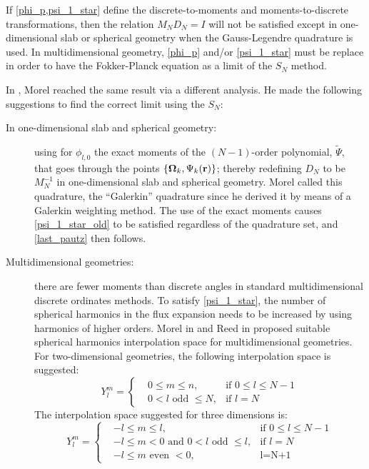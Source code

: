 If \cref{phi_p,psi_1_star} define the discrete-to-moments and
moments-to-discrete transformations, then the relation $M_N D_N=I$ will not be
satisfied except in one-dimensional slab or spherical geometry when the
Gauss-Legendre quadrature is used. In multidimensional geometry, \cref{phi_p}
and/or \cref{psi_1_star} must be replace in order to have the Fokker-Planck
equation as a limit of the $S_N$ method.

In \cite{galerkin_morel}, Morel reached the same result via a different
analysis. He made the following suggestions to find the correct limit using
the $S_N$:
\begin{description}
\item [In one-dimensional slab and spherical geometry:] using for $\phi_{l,0}$ 
the exact moments of the $(N-1)$-order polynomial, $\tilde{\Psi}$, that goes 
through the points $\{\boldsymbol{\Omega}_k,\Psi_k(\mathbf{r})\}$; thereby redefining $D_N$ to be 
$M_N^{-1}$ in one-dimensional slab and spherical geometry. Morel called this 
quadrature, the ``Galerkin'' quadrature since he derived it by means of a Galerkin 
weighting method. The use of the exact moments causes \cref{psi_1_star_old} to be
satisfied regardless of the quadrature set, and \cref{last_pautz} then follows.
\item [Multidimensional geometries:] there are fewer moments than discrete
angles in standard multidimensional discrete ordinates methods. To satisfy
\cref{psi_1_star}, the number of spherical harmonics in the flux expansion needs 
to be increased by using harmonics of higher orders. Morel in
\cite{galerkin_morel} and Reed in \cite{reed} proposed suitable spherical 
harmonics interpolation space for multidimensional geometries. For two-dimensional 
geometries, the following interpolation space is suggested:
\begin{equation}
Y_l^m = \left\{
\begin{aligned}
&0\leq m \leq n, & \textrm{if }0\leq l\leq N-1 \\
&0< l\textrm{ odd }\leq N, & \textrm{if }l=N
\end{aligned}
\right.
\end{equation}
The interpolation space suggested for three dimensions is:
\begin{equation}
Y_l^m = \left\{
\begin{aligned}
&-l\leq m \leq l, & \textrm{if }0\leq l \leq N-1\\
&-l\leq m <0 \textrm{ and } 0<l\textrm{ odd }\leq l, & \textrm{if }l=N\\
&-l\leq m\textrm{ even }<0,& \textrm{l=N+1}
\end{aligned}
\right.
\end{equation}


\end{description}
